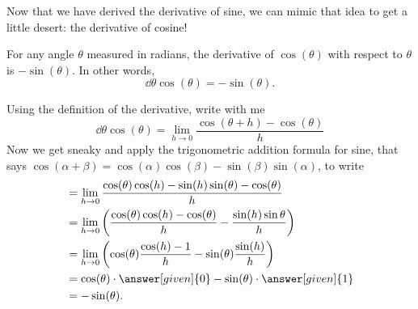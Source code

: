 \documentclass{ximera}
\begin{document}
Now that we have derived the derivative of sine, we can mimic that idea to get a little desert: the derivative of cosine!

\begin{theorem}\label{theorem:deriv cos}
For any angle $\theta$ measured in radians, the derivative of $\cos(\theta)$ with respect to $\theta$ is $-\sin(\theta)$.  In other words, 
\[
\dd{\theta} \cos(\theta) = -\sin(\theta).
\]
\begin{explanation}
Using the definition of the derivative, write with me
\[
\dd{\theta} \cos(\theta) = \lim_{h\to0} \frac{\cos(\theta+h)-\cos(\theta)}{h}
\]
Now we get sneaky and apply the trigonometric addition formula for sine, that says $\cos(\alpha+\beta) = \cos(\alpha)\cos(\beta)-\sin(\beta)\sin(\alpha)$, to write
\begin{align*}
  &= \lim_{h\to0} \frac{\cos(\theta)\cos(h)-\sin(h)\sin(\theta)-\cos(\theta)}{h}  \\
  &= \lim_{h\to0} \left(\frac{\cos(\theta)\cos(h)-\cos(\theta)}{h} - \frac{\sin(h)\sin{\theta}}{h} \right)\\
  &=\lim_{h\to0} \left(\cos (\theta)\frac{\cos(h) - 1}{h}-\sin(\theta)\frac{\sin(h)}{h}\right) \\
  &=\cos(\theta) \cdot \answer[given]{0} - \sin(\theta) \cdot \answer[given]{1}\\
  &= -\sin(\theta). 
\end{align*}
\end{explanation}
\end{theorem}
\end{document}
